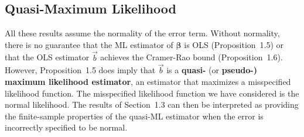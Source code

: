 \subsection*{Quasi-Maximum Likelihood}

All these results assume the normality of the error term.  Without normality, there is no
guarantee that the ML estimator of $\bm{\beta}$ is OLS (Proposition~1.5) or that the OLS
estimator $\vec{b}$ achieves the Cramer-Rao bound (Proposition~1.6).  However,
Proposition~1.5 does imply that $\vec{b}$ is a \textbf{quasi-} (or \textbf{pseudo-)
maximum likelihood estimator}, an estimator that maximizes a misspecified likelihood
function.  The misspecified likelihood function we have considered is the normal likelihood.
The results of Section~1.3 can then be interpreted as providing the finite-sample properties
of the quasi-ML estimator when the error is incorrectly specified to be normal.
